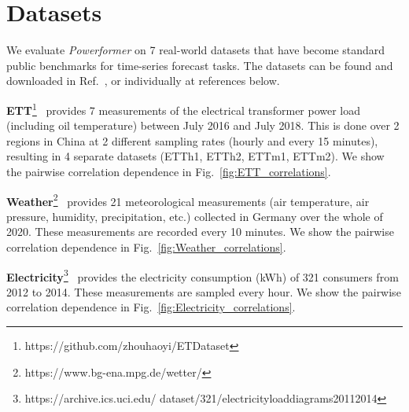 \section{Datasets\label{sec:datasets}}
We evaluate \emph{Powerformer} on 7 real-world datasets that have become standard public benchmarks for time-series forecast tasks. The datasets can be found and downloaded in Ref.~\cite{wu2021autoformer}, or individually at references below.


\hspace{1cm} \textbf{ETT}\footnote{https://github.com/zhouhaoyi/ETDataset}~\cite{Zhou.informer.2021} provides 7 measurements of the electrical transformer power load (including oil temperature) between July 2016 and July 2018. This is done over 2 regions in China at 2 different sampling rates (hourly and every 15 minutes), resulting in 4 separate datasets (ETTh1, ETTh2, ETTm1, ETTm2). We show the pairwise correlation dependence in Fig.~\ref{fig:ETT_correlations}.

\hspace{1cm} \textbf{Weather}\footnote{https://www.bg-ena.mpg.de/wetter/}~\cite{wu2021autoformer} provides 21 meteorological measurements (air temperature, air pressure, humidity, precipitation, etc.) collected in Germany over the whole of 2020. These measurements are recorded every 10 minutes. We show the pairwise correlation dependence in Fig.~\ref{fig:Weather_correlations}.

\hspace{1cm} \textbf{Electricity}\footnote{https://archive.ics.uci.edu/
    dataset/321/electricityloaddiagrams20112014}~\cite{wu2021autoformer} provides the electricity consumption (kWh) of 321 consumers from 2012 to 2014. These measurements are sampled every hour. We show the pairwise correlation dependence in Fig.~\ref{fig:Electricity_correlations}.
    
